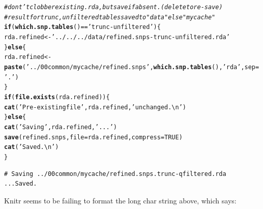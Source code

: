 \documentclass{article}\usepackage[]{graphicx}\usepackage[]{color}
\makeatletter
\newcommand{\hlnum}[1]{\textcolor[rgb]{0.686,0.059,0.569}{#1}}%
\newcommand{\hlstr}[1]{\textcolor[rgb]{0.192,0.494,0.8}{#1}}%
\newcommand{\hlcom}[1]{\textcolor[rgb]{0.678,0.584,0.686}{\textit{#1}}}%
\newcommand{\hlopt}[1]{\textcolor[rgb]{0,0,0}{#1}}%
\newcommand{\hlstd}[1]{\textcolor[rgb]{0.345,0.345,0.345}{#1}}%
\newcommand{\hlkwa}[1]{\textcolor[rgb]{0.161,0.373,0.58}{\textbf{#1}}}%
\newcommand{\hlkwb}[1]{\textcolor[rgb]{0.69,0.353,0.396}{#1}}%
\newcommand{\hlkwc}[1]{\textcolor[rgb]{0.333,0.667,0.333}{#1}}%
\newcommand{\hlkwd}[1]{\textcolor[rgb]{0.737,0.353,0.396}{\textbf{#1}}}%
\newenvironment{kframe}{%
 \def\at@end@of@kframe{}%
 \ifinner\ifhmode%
  \def\at@end@of@kframe{\end{minipage}}%
  \begin{minipage}{\columnwidth}%
 \fi\fi%
 \def\FrameCommand##1{\hskip\@totalleftmargin \hskip-\fboxsep
 \colorbox{shadecolor}{##1}\hskip-\fboxsep
     \hskip-\linewidth \hskip-\@totalleftmargin \hskip\columnwidth}%
 \MakeFramed {\advance\hsize-\width
   \@totalleftmargin\z@ \linewidth\hsize
   \@setminipage}}%
 {\par\unskip\endMakeFramed%
 \at@end@of@kframe}
\newenvironment{knitrout}{}{} %
\makeatother
\begin{document}
\begin{knitrout}
\begin{kframe}
\begin{alltt}
\hlcom{# dont't clobber existing .rda, but save if absent.  (delete to re-save)}
\hlcom{# result for trunc, unfiltered tables saved to "data" else "mycache"}
\hlkwa{if}\hlstd{(}\hlkwd{which.snp.tables}\hlstd{()} \hlopt{==} \hlstr{'trunc-unfiltered'}\hlstd{)\{}
  \hlstd{rda.refined} \hlkwb{<-} \hlstr{'../../../data/refined.snps-trunc-unfiltered.rda'}
\hlstd{\}} \hlkwa{else} \hlstd{\{}
  \hlstd{rda.refined} \hlkwb{<-} \hlkwd{paste}\hlstd{(}\hlstr{'../00common/mycache/refined.snps'}\hlstd{,} \hlkwd{which.snp.tables}\hlstd{(),} \hlstr{'rda'}\hlstd{,} \hlkwc{sep}\hlstd{=}\hlstr{'.'}\hlstd{)}
\hlstd{\}}
\hlkwa{if}\hlstd{(}\hlkwd{file.exists}\hlstd{(rda.refined))\{}
  \hlkwd{cat}\hlstd{(}\hlstr{'Pre-existing file'}\hlstd{, rda.refined,} \hlstr{'unchanged.\textbackslash{}n'}\hlstd{)}
\hlstd{\}} \hlkwa{else} \hlstd{\{}
  \hlkwd{cat}\hlstd{(}\hlstr{'Saving'}\hlstd{, rda.refined,} \hlstr{'...'}\hlstd{)}
  \hlkwd{save}\hlstd{(refined.snps,} \hlkwc{file}\hlstd{=rda.refined,} \hlkwc{compress}\hlstd{=}\hlnum{TRUE}\hlstd{)}
  \hlkwd{cat}\hlstd{(}\hlstr{'Saved.\textbackslash{}n'}\hlstd{)}
\hlstd{\}}
\end{alltt}
\begin{verbatim}
# Saving ../00common/mycache/refined.snps.trunc-qfiltered.rda ...Saved.
\end{verbatim}
\end{kframe}
\end{knitrout}

Knitr seems to be failing to format the long char string above, which says:
\end{document}
